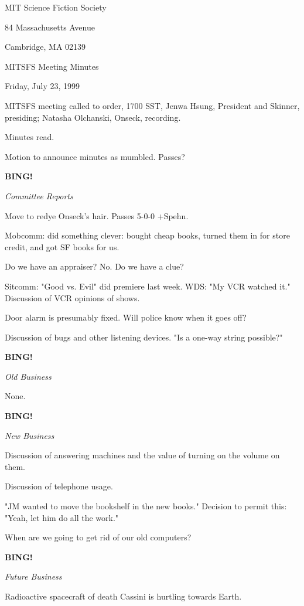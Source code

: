 \documentclass[12pt]{article}
\newcommand{\bing}{{\bf BING!} }
\newcommand{\goto}[1]{\bing \vskip 12pt \centerline{{\em{#1}}}}
\begin{document}
\begin{center}

MIT Science Fiction Society 

84 Massachusetts Avenue

Cambridge, MA 02139

\vspace{12pt}

MITSFS Meeting Minutes 

Friday, July 23, 1999

\end{center}
 
\vspace{18pt}

\setlength{\parskip}{6pt}

\noindent
MITSFS meeting called to order, 1700 SST,
Jenwa Hsung, President and Skinner, presiding; Natasha Olchanski, Onseck, recording.

Minutes read.

Motion to announce minutes as mumbled. Passes?

\goto{Committee Reports}

Move to redye Onseck's hair. Passes 5-0-0 +Spehn.

Mobcomm: did something clever: bought cheap books, turned them in for store credit, and got SF books for us.

Do we have an appraiser? No. Do we have a clue?

Sitcomm: "Good vs. Evil" did premiere last week. WDS: "My VCR watched it." Discussion of VCR opinions of shows.

Door alarm is presumably fixed. Will police know when it goes off?

Discussion of bugs and other listening devices. "Is a one-way string possible?"

\goto{Old Business}

None.

\goto{New Business}

Discussion of answering machines and the value of turning on the volume on them.

Discussion of telephone usage.

"JM wanted to move the bookshelf in the new books." Decision to permit this: "Yeah, let him do all the work."

When are we going to get rid of our old computers?

\goto{Future Business}

Radioactive spacecraft of death Cassini is hurtling towards Earth.
\end{document}
